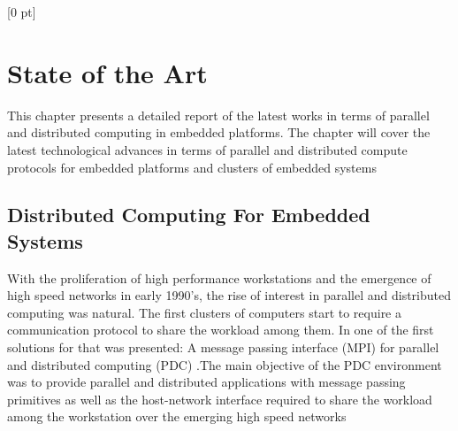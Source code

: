 \titlespacing{\chapter}{0 pt}{30 pt}{50 pt}[0 pt]
\titleformat{\section}{\Large\bfseries}{\thesection}{0 pt}{\hspace{30 pt}}
\titleformat{\subsection}{\large\bfseries}{\thesubsection}{0 pt}{\hspace{30 pt}}
\pagestyle{fancy}
\fancyhead[LO,LE]{\footnotesize\textit{\leftmark}}
\fancyhead[RO,RE]{\thepage}
\fancyfoot[CO,CE]{}

\chapter{State of the Art} %

\normalsize

\noindent

This chapter presents a detailed report of the latest works in terms of parallel
and distributed computing in embedded platforms. The chapter will cover the
latest technological advances in terms of  parallel and distributed compute
protocols for embedded platforms and clusters of embedded systems

\section{Distributed Computing For Embedded Systems}

With the proliferation of high performance workstations and the emergence of
high speed networks in early 1990's, the rise of interest in parallel and
distributed computing was natural. The first clusters of computers start to
require a communication protocol to share the workload among them. In
\cite{Salim} one of the first solutions for that was presented: A message
passing interface (MPI) for parallel and distributed computing (PDC) .The main
objective of the PDC environment was to provide parallel and distributed
applications with message passing primitives as well as the host-network
interface required to share the workload among the workstation over the
emerging high speed networks

